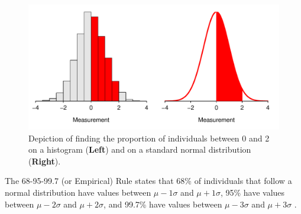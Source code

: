 \documentclass[10pt,openany]{book}\usepackage[]{graphicx}\usepackage[]{color}
\newenvironment{knitrout}{}{} %
\begin{document}
\begin{knitrout}
\color{fgcolor}\begin{figure}[hbtp]

{\centering \includegraphics[width=.8\linewidth]{Figs/NormDistShade-1} 

}

\caption[Depiction of finding the proportion of individuals between 0 and 2 on a histogram (\textbf{Left}) and on a standard normal distribution (\textbf{Right})]{Depiction of finding the proportion of individuals between 0 and 2 on a histogram (\textbf{Left}) and on a standard normal distribution (\textbf{Right}).}\label{fig:NormDistShade}
\end{figure}


\end{knitrout}


The 68-95-99.7 (or Empirical) Rule states that 68\% of individuals that follow a normal distribution have values between $\mu-1\sigma$ and $\mu+1\sigma$, 95\% have values between $\mu-2\sigma$ and $\mu+2\sigma$, and 99.7\% have values between $\mu-3\sigma$ and $\mu+3\sigma$ .
\end{document}
